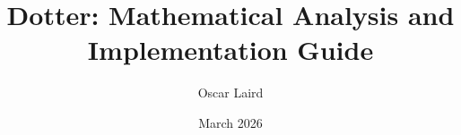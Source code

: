 \documentclass{report}
\begin{document}
\hypertarget{titlepage}{}

\title{Dotter: Mathematical Analysis and Implementation Guide}
\date{March 2026}
\author{Oscar Laird}
\maketitle

\clearpage
\hypertarget{tocpage}{}
{}
\tableofcontents
\newpage


















{}

\end{document}
